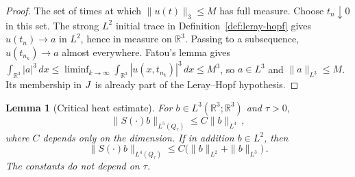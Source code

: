 \documentclass[11pt,letterpaper]{article}
\numberwithin{equation}{section}
\theoremstyle{plain}
\newtheorem{lemma}[theorem]{Lemma}
\theoremstyle{definition}
\theoremstyle{remark}
\begin{document}
\begin{proof}
The set of times at which $\|u(t)\|_3\le M$ has full measure. Choose $t_n\downarrow0$ in this set. The strong $L^2$ initial trace in Definition~\ref{def:leray-hopf} gives $u(t_n)\to a$ in $L^2$, hence in measure on $\mathbb R^3$. Passing to a subsequence, $u(t_{n_k})\to a$ almost everywhere. Fatou's lemma gives $\int_{\mathbb R^3}|a|^3\,dx\le\liminf_{k\to\infty}\int_{\mathbb R^3}|u(x,t_{n_k})|^3\,dx\le M^3$, so $a\in L^3$ and $\|a\|_{L^3}\le M$. Its membership in $J$ is already part of the Leray--Hopf hypothesis.
\end{proof}

\begin{lemma}[Critical heat estimate]\label{lem:pv-heat-critical}
For $b\in L^3(\mathbb R^3;\mathbb R^3)$ and $\tau>0$,
\begin{equation}\label{eq:pv-heat-l5}
 \|S(\cdot)b\|_{L^5(Q_\tau)}\le C\|b\|_{L^3}\,,
\end{equation}
where $C$ depends only on the dimension. If in addition $b\in L^2$, then
\begin{equation}\label{eq:pv-heat-l4}
 \|S(\cdot)b\|_{L^4(Q_\tau)}\le C\bigl(\|b\|_{L^2}+\|b\|_{L^3}\bigr)\,.
\end{equation}
The constants do not depend on $\tau$.
\end{lemma}
\end{document}
